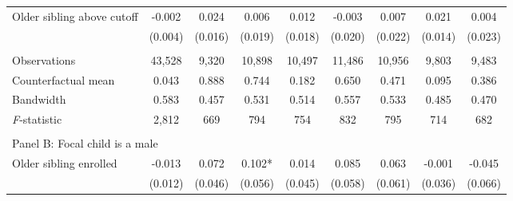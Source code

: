 \begin{table}[!htbp]
{{\begin{tabular}{lcccccccc}
Older sibling above cutoff&      -0.002   &       0.024   &       0.006   &       0.012   &      -0.003   &       0.007   &       0.021   &       0.004   \\
                    &     (0.004)   &     (0.016)   &     (0.019)   &     (0.018)   &     (0.020)   &     (0.022)   &     (0.014)   &     (0.023)   \\
                    &               &               &               &               &               &               &               &               \\
Observations        &      43,528   &       9,320   &      10,898   &      10,497   &      11,486   &      10,956   &       9,803   &       9,483   \\
Counterfactual mean &       0.043   &       0.888   &       0.744   &       0.182   &       0.650   &       0.471   &       0.095   &       0.386   \\
Bandwidth           &       0.583   &       0.457   &       0.531   &       0.514   &       0.557   &       0.533   &       0.485   &       0.470   \\
\textit{F}-statistic&       2,812   &         669   &         794   &         754   &         832   &         795   &         714   &         682   \\
 
&  &  &  & & & & & \\
\multicolumn{10}{l}{Panel B: Focal child is a male} \\
Older sibling enrolled&      -0.013   &       0.072   &       0.102*  &       0.014   &       0.085   &       0.063   &      -0.001   &      -0.045   \\
                    &     (0.012)   &     (0.046)   &     (0.056)   &     (0.045)   &     (0.058)   &     (0.061)   &     (0.036)   &     (0.066)   \\
 

\end{tabular}}}
\end{table}

